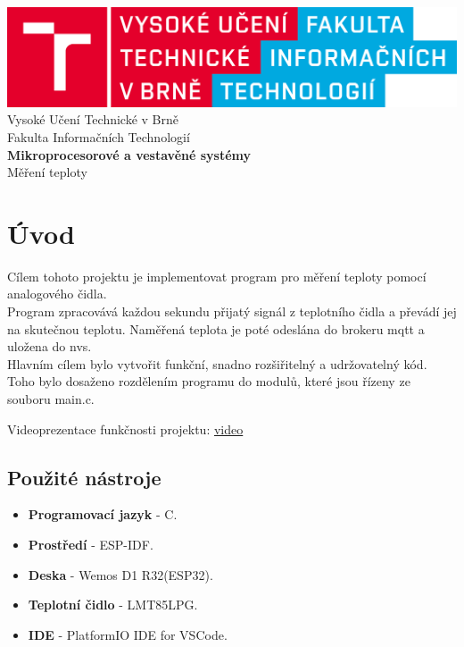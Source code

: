 \documentclass[12pt]{article}
\begin{document}
\onehalfspacing
\begin{center}
    {\includegraphics[width=0.7\linewidth]{logo_cz.png}}\\[50pt]
    {\Huge Vysoké Učení Technické v Brně}\\[10pt]
    {\huge Fakulta Informačních Technologií}\\[150pt]
    {\Huge \textbf{Mikroprocesorové a vestavěné systémy}}\\[15pt]
    {\huge Měření teploty}\\[225pt]
    \noindent
\end{center}
\newpage


\section {Úvod}
Cílem tohoto projektu je implementovat program pro měření teploty pomocí analogového čidla. \\
Program zpracovává každou sekundu přijatý signál z teplotního čidla a převádí jej na skutečnou teplotu. Naměřená teplota je poté odeslána do brokeru mqtt a uložena do nvs.\\
Hlavním cílem bylo vytvořit funkční, snadno rozšiřitelný a udržovatelný kód. Toho bylo dosaženo rozdělením programu do modulů, které jsou řízeny ze souboru main.c.

Videoprezentace funkčnosti projektu: \href{https://youtu.be/4n5uWdhA3MM?si=1hYrYChPR6tf-U4K}{video}

\subsection{Použité nástroje}
\begin{itemize}
    \item \textbf{Programovací jazyk} - C.
    \item \textbf{Prostředí} - ESP-IDF.
    \item \textbf{Deska} - Wemos D1 R32(ESP32).
    \item \textbf{Teplotní čidlo} - LMT85LPG.
    \item \textbf{IDE} - PlatformIO IDE for VSCode.
\end{itemize}
\end{document}
